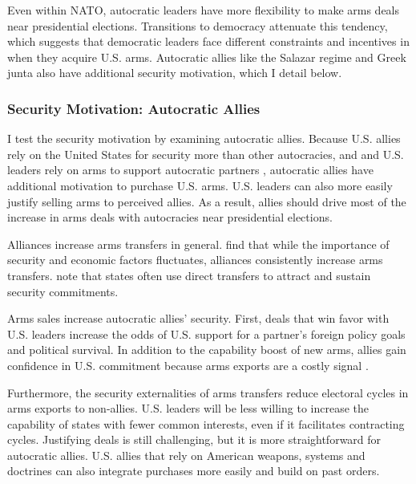 \documentclass[12pt]{article}
\begin{document}
Even within NATO, autocratic leaders have more flexibility to make arms deals near presidential elections. 
Transitions to democracy attenuate this tendency, which suggests that democratic leaders face different constraints and incentives in when they acquire U.S. arms. 
Autocratic allies like the Salazar regime and Greek junta also have additional security motivation, which I detail below. 



\subsubsection{Security Motivation: Autocratic Allies}


I test the security motivation by examining autocratic allies. 
Because U.S. allies rely on the United States for security more than other autocracies, and and U.S. leaders rely on arms to support autocratic partners \citep{Yarhi-Miloetal2016}, autocratic allies have additional motivation to purchase U.S. arms. 
U.S. leaders can also more easily justify selling arms to perceived allies. 
As a result, allies should drive most of the increase in arms deals with autocracies near presidential elections. 


Alliances increase arms transfers in general. 
\citet{Thurneretal2019} find that while the importance of security and economic factors fluctuates, alliances consistently increase arms transfers.
\citet[pg. 184-5]{IkenberryGrieco2003} note that states often use direct transfers to attract and sustain security commitments. 


Arms sales increase autocratic allies' security.
First, deals that win favor with U.S. leaders increase the odds of U.S. support for a partner's foreign policy goals and political survival.  
In addition to the capability boost of new arms, allies gain confidence in U.S. commitment because arms exports are a costly signal \citep{McManusYarhi-Milo2017}.


Furthermore, the security externalities of arms transfers reduce electoral cycles in arms exports to non-allies. 
U.S. leaders will be less willing to increase the capability of states with fewer common interests, even if it facilitates contracting cycles.
Justifying deals is still challenging, but it is more straightforward for autocratic allies. 
U.S. allies that rely on American weapons, systems and doctrines can also integrate purchases more easily and build on past orders. 
\end{document}
